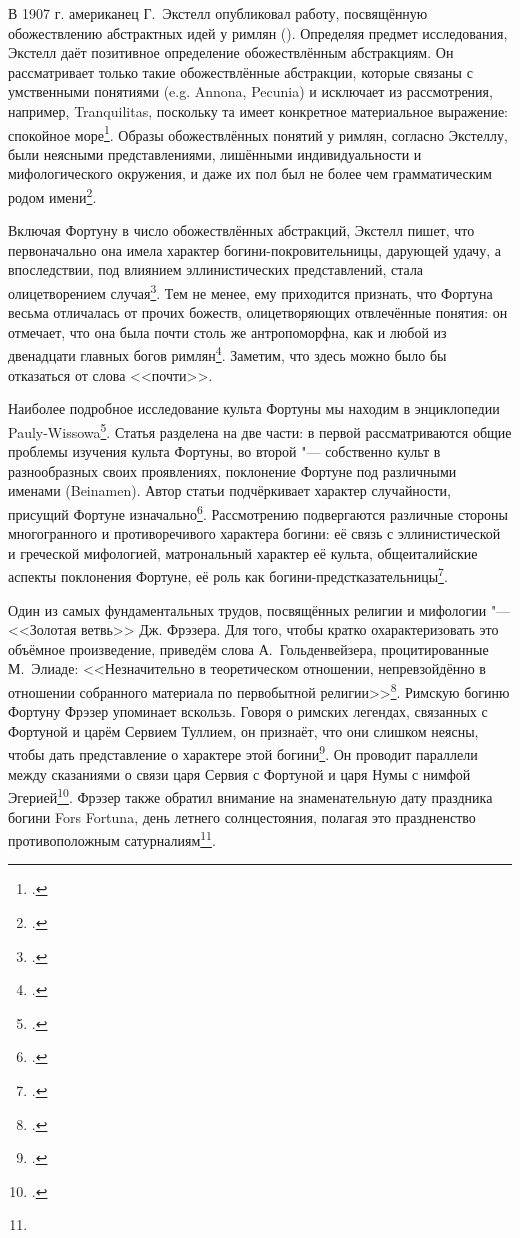 
В 1907 г. американец Г.~Экстелл опубликовал работу, посвящённую обожествлению абстрактных идей у римлян (). Определяя предмет исследования, Экстелл даёт позитивное определение обожествлённым абстракциям. Он рассматривает только такие обожествлённые абстракции, которые связаны с умственными понятиями (e.g. Annona, Pecunia) и исключает из рассмотрения, например, Tranquilitas, поскольку та имеет конкретное материальное выражение: спокойное море\footcite[P. 7]{Axtell1907}. Образы обожествлённых понятий у римлян, согласно Экстеллу, были неясными представлениями, лишёнными индивидуальности и мифологического окружения, и даже их пол был не более чем грамматическим родом имени\footcite[P. 86]{Axtell1907}.

Включая Фортуну в число обожествлённых абстракций, Экстелл пишет, что первоначально она имела характер богини-покровительницы, дарующей удачу, а впоследствии, под влиянием эллинистических представлений, стала олицетворением случая\footcite[P. 9--10]{Axtell1907}. Тем не менее, ему приходится признать, что Фортуна весьма отличалась от прочих божеств, олицетворяющих отвлечённые понятия: он отмечает, что она была почти столь же антропоморфна, как и любой из двенадцати главных богов римлян\footcite[P. 88]{Axtell1907}. Заметим, что здесь можно было бы отказаться от слова <<почти>>.


Наиболее подробное исследование культа Фортуны мы находим в энциклопедии Pauly-Wissowa\footcite[Sp. 12--42]{FortunaOtto1910}. Статья разделена на две части: в первой рассматриваются общие проблемы изучения культа Фортуны, во второй "--- собственно культ в разнообразных своих проявлениях, поклонение Фортуне под различными именами (Beinamen). Автор статьи подчёркивает характер случайности, присущий Фортуне изначально\footcite[Sp. 13]{FortunaOtto1910}. Рассмотрению подвергаются различные стороны многогранного и противоречивого характера богини: её связь с эллинистической  и греческой мифологией, матрональный характер её культа, общеиталийские аспекты поклонения Фортуне, её роль как богини-предстказательницы\footcite[Sp. 14--15]{FortunaOtto1910}.


Один из самых фундаментальных трудов, посвящённых религии и мифологии "--- <<Золотая ветвь>> Дж. Фрэзера. Для того, чтобы кратко охарактеризовать это объёмное произведение, приведём слова А.~Гольденвейзера, процитированные М.~Элиаде: <<Незначительно в теоретическом отношении, непревзойдённо в отношении собранного материала по первобытной религии>>\footcite[С. ]{Eliade1999}. Римскую богиню Фортуну Фрэзер упоминает вскользь. Говоря о римских легендах, связанных с Фортуной и царём Сервием Туллием, он признаёт, что они слишком неясны, чтобы дать представление о характере этой богини\footcite[P. 193]{Frazer1911II}. Он проводит параллели между сказаниями о связи царя Сервия с Фортуной и царя Нумы с нимфой Эгерией\footcite[P. 272]{Frazer1911II}. Фрэзер также обратил внимание на знаменательную дату праздника богини Fors Fortuna, день летнего солнцестояния, полагая это праздненство противоположным сатурналиям\footnote{}.

